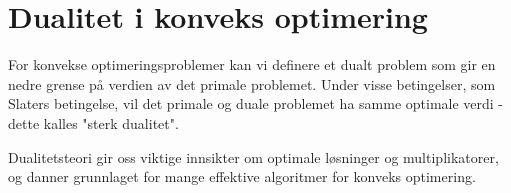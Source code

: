 \section{Dualitet i konveks optimering}

For konvekse optimeringsproblemer kan vi definere et dualt problem som gir en nedre grense på verdien av det primale problemet. Under visse betingelser, som Slaters betingelse, vil det primale og duale problemet ha samme optimale verdi - dette kalles "sterk dualitet".

Dualitetsteori gir oss viktige innsikter om optimale løsninger og multiplikatorer, og danner grunnlaget for mange effektive algoritmer for konveks optimering.
